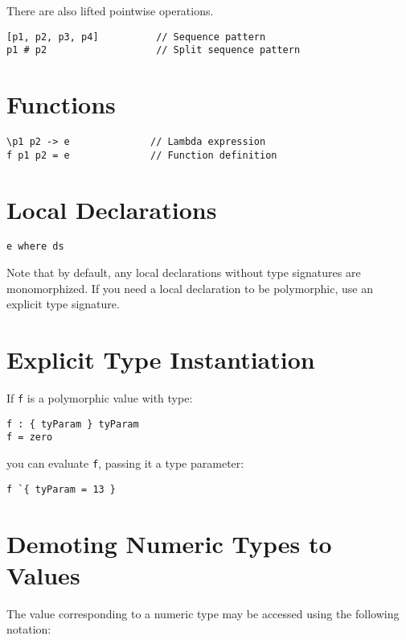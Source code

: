 There are also lifted pointwise operations.

\begin{verbatim}
[p1, p2, p3, p4]          // Sequence pattern
p1 # p2                   // Split sequence pattern
\end{verbatim}

\section{Functions}\label{functions}

\begin{verbatim}
\p1 p2 -> e              // Lambda expression
f p1 p2 = e              // Function definition
\end{verbatim}

\section{Local Declarations}\label{local-declarations}

\begin{verbatim}
e where ds
\end{verbatim}

Note that by default, any local declarations without type signatures are
monomorphized. If you need a local declaration to be polymorphic, use an
explicit type signature.

\section{Explicit Type Instantiation}\label{explicit-type-instantiation}

If \texttt{f} is a polymorphic value with type:

\begin{verbatim}
f : { tyParam } tyParam
f = zero
\end{verbatim}

you can evaluate \texttt{f}, passing it a type parameter:

\begin{verbatim}
f `{ tyParam = 13 }
\end{verbatim}

\section{Demoting Numeric Types to
Values}\label{demoting-numeric-types-to-values}

The value corresponding to a numeric type may be accessed using the
following notation:

